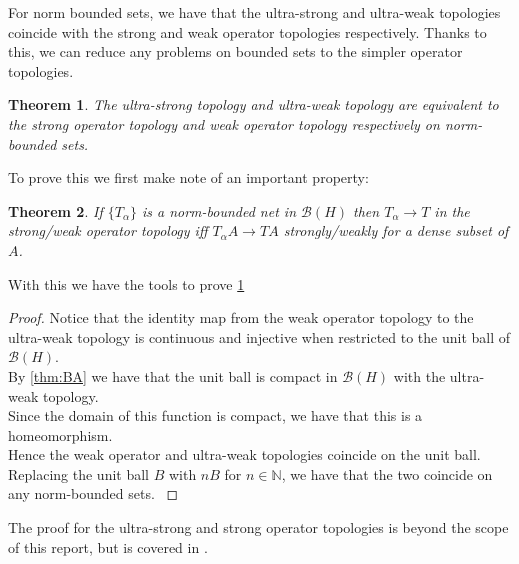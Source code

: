\documentclass{article}
\theoremstyle{plain}
\newtheorem{theorem}{Theorem}
\theoremstyle{definition}
\newcommand{\BH}{\cal{B}(H)}
\newcommand{\bb}[1]{\mathbb{#1}}
\renewcommand{\cal}[1]{\mathcal{#1}}
\begin{document}
        For norm bounded sets, we have that the ultra-strong and ultra-weak topologies coincide with the strong and weak operator topologies respectively.
        Thanks to this, we can reduce any problems on bounded sets to the simpler operator topologies.
        \begin{theorem}\label{thm:bounded}
                The ultra-strong topology and ultra-weak topology are equivalent to the strong operator topology and weak operator topology respectively on norm-bounded sets.
        \end{theorem}
        To prove this we first make note of an important property:
        \begin{theorem} \label{thm:bounded convergence}
                If $\{T_\alpha\}$ is a norm-bounded net in $\BH$ then $T_\alpha \to T$ in the strong/weak operator topology iff $T_\alpha A \to TA$ strongly/weakly for a dense subset of $A$.
        \end{theorem}
        With this we have the tools to prove \cref{thm:bounded}
        \begin{proof}
                Notice that the identity map from the weak operator topology to the ultra-weak topology is continuous and injective when restricted to the unit ball of $\BH$.\\
                By \cref{thm:BA} we have that the unit ball is compact in $\BH$ with the ultra-weak topology.\\
                Since the domain of this function is compact, we have that this is a homeomorphism.\\
                Hence the weak operator and ultra-weak topologies coincide on the unit ball.\\
                Replacing the unit ball $B$ with $nB$ for $n \in \bb{N}$, we have that the two coincide on any norm-bounded sets. \cite{pedersen}
        \end{proof}
        The proof for the ultra-strong and strong operator topologies is beyond the scope of this report, but is covered in \cite{cycr}.
\end{document}
